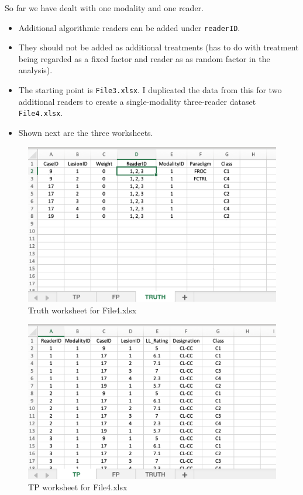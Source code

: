 \documentclass[
]{book}
\providecommand{\tightlist}{%
  \setlength{\itemsep}{0pt}\setlength{\parskip}{0pt}}
\begin{document}
So far we have dealt with one modality and one reader.

\begin{itemize}
\tightlist
\item
  Additional algorithmic readers can be added under \texttt{readerID}.
\item
  They should not be added as additional treatments (has to do with treatment being regarded as a fixed factor and reader as as random factor in the analysis).
\item
  The starting point is \texttt{File3.xlsx}. I duplicated the data from this for two additional readers to create a single-modality three-reader dataset \texttt{File4.xlsx}.
\item
  Shown next are the three worksheets.
\end{itemize}

\begin{figure}

{\centering \includegraphics[width=0.5\linewidth,height=0.2\textheight]{images/classification/File4Truth} 

}

\caption{Truth worksheet for File4.xlsx}\label{fig:File4Truth}
\end{figure}

\begin{figure}

{\centering \includegraphics[width=0.5\linewidth,height=0.2\textheight]{images/classification/File4TP} 

}

\caption{TP worksheet for File4.xlsx}\label{fig:File4TP}
\end{figure}
\end{document}
